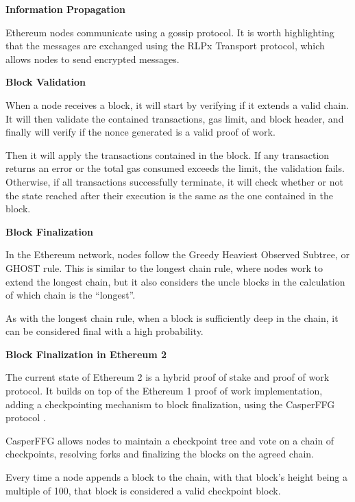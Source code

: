 \vspace{0.25cm}


\textbf{Information Propagation}

Ethereum nodes communicate using a gossip protocol. It is worth highlighting that the messages are exchanged using the RLPx Transport protocol, which allows nodes to send encrypted messages.

\vspace{0.25cm}

\textbf{Block Validation}

When a node receives a block, it will start by verifying if it extends a valid chain. It will then validate the contained transactions, gas limit, and block header, and finally will verify if the nonce generated is a valid proof of work.

Then it will apply the transactions contained in the block. If any transaction returns an error or the total gas consumed exceeds the limit, the validation fails. Otherwise, if all transactions successfully terminate, it will check whether or not the state reached after their execution is the same as the one contained in the block.


\vspace{0.25cm}

\textbf{Block Finalization}

In the Ethereum network, nodes follow the Greedy Heaviest Observed Subtree, or GHOST rule. This is similar to the longest chain rule, where nodes work to extend the longest chain, but it also considers the uncle blocks in the calculation of which chain is the “longest”.

As with the longest chain rule, when a block is sufficiently deep in the chain, it can be considered final with a high probability.

\vspace{0.25cm}

\textbf{Block Finalization in Ethereum 2}

The current state of Ethereum 2 is a hybrid proof of stake and proof of work protocol. It builds on top of the Ethereum 1 proof of work implementation, adding a checkpointing mechanism to block finalization, using the CasperFFG protocol \cite{casperffg}.

CasperFFG \cite{casperffg} allows nodes to maintain a checkpoint tree and vote on a chain of checkpoints, resolving forks and finalizing the blocks on the agreed chain.

Every time a node appends a block to the chain, with that block’s height being a multiple of 100, that block is considered a valid checkpoint block.

